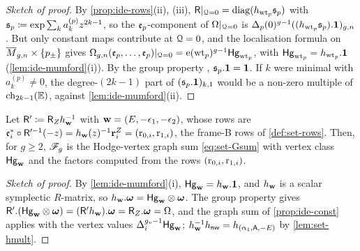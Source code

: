 \begin{proof}[Sketch of proof]
By \cref{prop:ide-rows}(ii), (iii), $\mathsf{R}|_{\mathcal{Q}=0}=\mathrm{diag}(h_{\mathrm{wt}_p}\mathfrak{s}_p)$ with $\mathfrak{s}_p\coloneqq\exp\sum_ka_k^{(p)}z^{2k-1}$, so the $\mathfrak{e}_p$-component of $\Omega|_{\mathcal{Q}=0}$ is $\Delta_p(0)^{g-1}((h_{\mathrm{wt}_p}\mathfrak{s}_p).\mathbf{1})_{g,n}$. But only constant maps contribute at $\mathcal{Q}=0$, and the localisation formula \cite{GP99} on $\overline{M}_{g,n}\times\{p_\pm\}$ gives $\Omega_{g,n}(\mathfrak{e}_p,\dots,\mathfrak{e}_p)|_{\mathcal{Q}=0}=\mathrm{e}(\mathrm{wt}_p)^{g-1}\mathsf{Hg}_{\mathrm{wt}_p}$, with $\mathsf{Hg}_{\mathrm{wt}_p}=h_{\mathrm{wt}_p}.\mathbf{1}$ (\cref{lem:ide-mumford}(i)). By the group property \cite[Prop.~2.14]{PPZ15}, $\mathfrak{s}_p.\mathbf{1}=\mathbf{1}$. If $k$ were minimal with $a^{(p)}_k\neq0$, the degree-$(2k-1)$ part of $(\mathfrak{s}_p.\mathbf{1})_{k,1}$ would be a non-zero multiple of $\mathrm{ch}_{2k-1}(\mathbb{E})$, against \cref{lem:ide-mumford}(ii).
\end{proof}

\begin{prop}
\label{prop:ide-frameB}
Let $\mathsf{R}'\coloneqq\mathsf{R}_{Z}h_{\mathbf{w}}^{-1}$ with $\mathbf{w}=(E,-\epsilon_1,-\epsilon_2)$, whose rows are $\mathfrak{e}_i^*\circ\mathsf{R}'^{-1}(-z)=h_{\mathbf{w}}(z)^{-1}\mathbf{r}^Z_i=(\mathrm{r}_{0,i},\mathrm{r}_{1,i})$, the frame-B rows of \cref{def:set-rows}. Then, for $g\geq2$, $\mathscr{F}_g$ is the Hodge-vertex graph sum \eqref{eq:set-Gsum} with vertex class $\mathsf{Hg}_{\mathbf{w}}$ and the factors computed from the rows $(\mathrm{r}_{0,i},\mathrm{r}_{1,i})$.
\end{prop}

\begin{proof}[Sketch of proof]
By \cref{lem:ide-mumford}(i), $\mathsf{Hg}_{\mathbf{w}}=h_{\mathbf{w}}.\mathbf{1}$, and $h_{\mathbf{w}}$ is a scalar symplectic $R$-matrix, so $h_{\mathbf{w}}.\boldsymbol{\omega}=\mathsf{Hg}_{\mathbf{w}}\otimes\boldsymbol{\omega}$. The group property \cite[Prop.~2.14]{PPZ15} gives $\mathsf{R}'.(\mathsf{Hg}_{\mathbf{w}}\otimes\boldsymbol{\omega})=(\mathsf{R}'h_{\mathbf{w}}).\boldsymbol{\omega}=\mathsf{R}_{Z}.\boldsymbol{\omega}=\Omega$, and the graph sum of \cref{prop:ide-const} applies with the vertex values $\Delta_i^{g_v-1}\mathsf{Hg}_{\mathbf{w}}$; $h_{\mathbf{w}}^{-1}h_{\mathsf{nw}}=h_{(\alpha_1,\mathsf{A},-E)}$ by \cref{lem:set-hmult}.
\end{proof}

